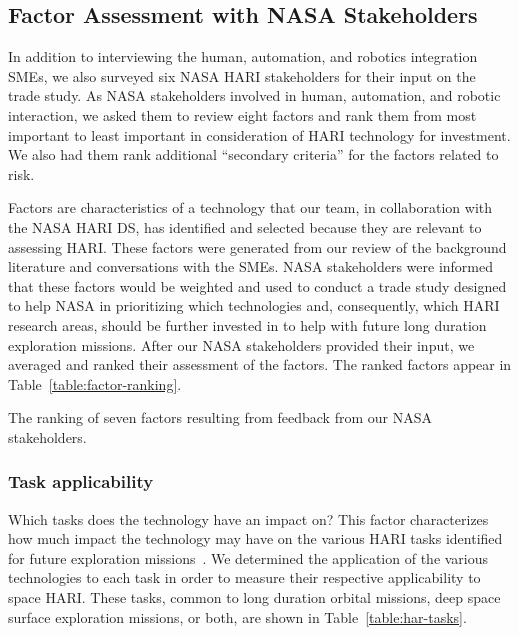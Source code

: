 \subsection{Factor Assessment with NASA Stakeholders}
In addition to interviewing the human, automation, and robotics integration SMEs, we also surveyed six NASA HARI stakeholders for their input on the trade study.
As NASA stakeholders involved in human, automation, and robotic interaction, we asked them to review eight factors and rank them from most important to least important in consideration of HARI technology for investment.
We also had them rank additional ``secondary criteria'' for the factors related to risk.

Factors are characteristics of a technology that our team, in collaboration with the NASA HARI DS, has identified and selected because they are relevant to assessing HARI.
These factors were generated from our review of the background literature and conversations with the SMEs.
NASA stakeholders were informed that these factors would be weighted and used to conduct a trade study designed to help NASA in prioritizing which technologies and, consequently, which HARI research areas, should be further invested in to help with future long duration exploration missions.
After our NASA stakeholders provided their input, we averaged and ranked their assessment of the factors.
The ranked factors appear in Table~\ref{table:factor-ranking}.

\begin{table}[tb]
    \centering
    \caption[The ranking of seven factors resulting from feedback from our NASA stakeholders]{The ranking of seven factors resulting from feedback from our NASA stakeholders.}
    \label{table:factor-ranking}
\end{table}

\subsubsection{Task applicability}
Which tasks does the technology have an impact on? This factor characterizes how much impact the technology may have on the various HARI tasks identified for future exploration missions~\citep{marquez2017future}.
We determined the application of the various technologies to each task in order to measure their respective applicability to space HARI.
These tasks, common to long duration orbital missions, deep space surface exploration missions, or both, are shown in Table~\ref{table:har-tasks}.

